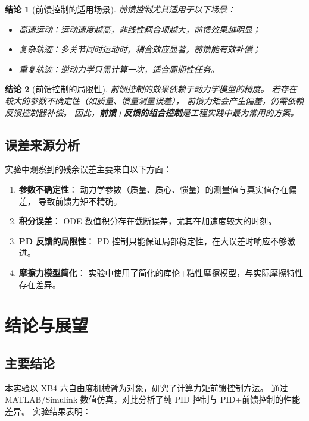 \documentclass[12pt,a4paper,oneside]{article}
\numberwithin{equation}{section}
\newtheorem{conclusion}{结论}
\begin{document}
\begin{conclusion}[前馈控制的适用场景]
    前馈控制尤其适用于以下场景：
    \begin{itemize}
        \item 高速运动：运动速度越高，非线性耦合项越大，前馈效果越明显；
        \item 复杂轨迹：多关节同时运动时，耦合效应显著，前馈能有效补偿；
        \item 重复轨迹：逆动力学只需计算一次，适合周期性任务。
    \end{itemize}
\end{conclusion}

\begin{conclusion}[前馈控制的局限性]
    前馈控制的效果依赖于动力学模型的精度。
    若存在较大的参数不确定性（如质量、惯量测量误差），
    前馈力矩会产生偏差，仍需依赖反馈控制器补偿。
    因此，\textbf{前馈+反馈的组合控制}是工程实践中最为常用的方案。
\end{conclusion}

\subsection{误差来源分析}

实验中观察到的残余误差主要来自以下方面：

\begin{enumerate}
    \item \textbf{参数不确定性}：
        动力学参数（质量、质心、惯量）的测量值与真实值存在偏差，
        导致前馈力矩不精确。
    \item \textbf{积分误差}：
        ODE 数值积分存在截断误差，尤其在加速度较大的时刻。
    \item \textbf{PD 反馈的局限性}：
        PD 控制只能保证局部稳定性，在大误差时响应不够激进。
    \item \textbf{摩擦力模型简化}：
        实验中使用了简化的库伦+粘性摩擦模型，与实际摩擦特性存在差异。
\end{enumerate}

\section{结论与展望}

\subsection{主要结论}

本实验以 XB4 六自由度机械臂为对象，研究了计算力矩前馈控制方法。
通过 MATLAB/Simulink 数值仿真，对比分析了纯 PID 控制与 PID+前馈控制的性能差异。
实验结果表明：
\end{document}
